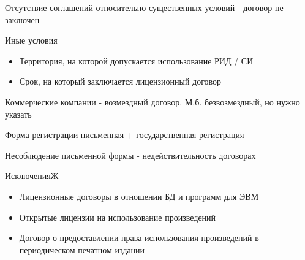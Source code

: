 \documentclass[12pt]{article}
\begin{document}
Отсутствие соглашений относительно существенных условий - договор не заключен

Иные условия
\begin{itemize}
  \item Территория, на которой допускается использование РИД / СИ
  \item Срок, на который заключается лицензионный договор
\end{itemize}

Коммерческие компании - возмездный договор. М.б. безвозмездный, но нужно указать

Форма регистрации письменная + государственная регистрация

Несоблюдение письменной формы - недействительность договорах

ИсключенияЖ
\begin{itemize}
  \item Лицензионные договоры в отношении БД и программ для ЭВМ
  \item Открытые лицензии на использование произведений
  \item Договор о предоставлении права использования произведений в периодическом печатном издании
\end{itemize}
\end{document}
